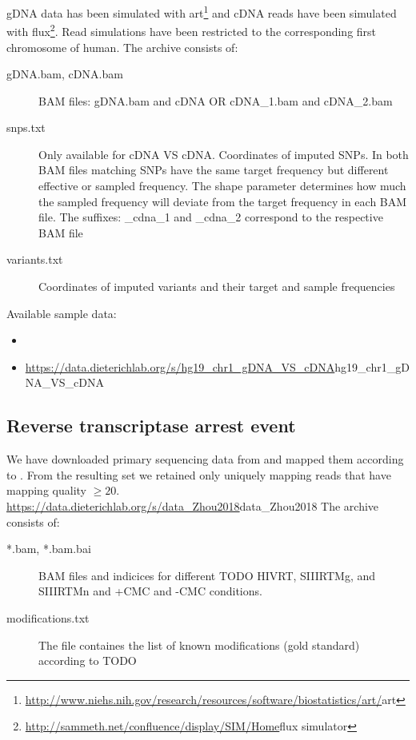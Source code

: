 \documentclass[10pt,a4paper]{article}
\begin{document}
gDNA data has been simulated with
art\footnote{\url{http://www.niehs.nih.gov/research/resources/software/biostatistics/art/}{art}}
and cDNA reads have been simulated with
flux\footnote{\url{http://sammeth.net/confluence/display/SIM/Home}{flux simulator}}. Read
simulations have been restricted to the corresponding first chromosome of human.
The archive consists of:
\begin{description}
  \item[gDNA.bam, cDNA.bam] BAM files: gDNA.bam and cDNA OR cDNA\_1.bam and cDNA\_2.bam
  \item[snps.txt] Only available for cDNA VS cDNA. Coordinates of imputed SNPs. In both
  BAM files matching SNPs have the same target frequency but different effective or sampled
  frequency. The shape parameter determines how much the sampled frequency will deviate from the
  target frequency in each BAM file. The suffixes: \_cdna\_1 and \_cdna\_2 correspond to the
  respective BAM file
  \item[variants.txt] Coordinates of imputed variants and their target and sample
  frequencies
\end{description}
Available sample data:
\begin{itemize}
  \item
  \item \url{https://data.dieterichlab.org/s/hg19_chr1_gDNA_VS_cDNA}{hg19\_chr1\_gDNA\_VS\_cDNA}
\end{itemize}
\subsection{Reverse transcriptase arrest event}
We have downloaded primary sequencing data from \cite{Zhou2018} and mapped them according to .
From the resulting set we retained only uniquely mapping reads that have mapping quality $\ge 20$.
\url{https://data.dieterichlab.org/s/data_Zhou2018}{data\_Zhou2018} 
The archive consists of:
\begin{description}
  \item[*.bam, *.bam.bai] BAM files and indicices for different TODO HIVRT, SIIIRTMg, and SIIIRTMn and 
  +CMC and -CMC conditions.
  \item[modifications.txt] The file containes the list of known modifications (gold standard) according to TODO
\end{description}
\end{document}
